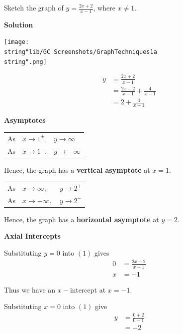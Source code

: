 \documentclass[11pt,a4paper]{book}
\begin{document}
\begin{example}{}

Sketch the graph of ${\displaystyle y=\frac{2x+2}{x-1}}$, where $x\neq1$.

\textbf{Solution}

\begin{center}
\texttt{[image: \\string"lib/GC Screenshots/GraphTechniques1a\\string".png]}
\par\end{center}
\begin{align*}
y & =\frac{2x+2}{x-1}\tag{1}\\
 & =\frac{2x-2}{x-1}+\frac{4}{x-1}\\
 & =2+\frac{4}{x-1}
\end{align*}

\textbf{Asymptotes}

\medskip{}

\begin{tabular}{>{\raggedright}p{0.6cm}>{\raggedright}p{1.8cm}>{\raggedright}p{2cm}}
As & $x\rightarrow1^{+}$, & $y\rightarrow\infty$

\medskip{}\tabularnewline
As & $x\rightarrow1^{-}$, & $y\rightarrow-\infty$

\medskip{}\tabularnewline
\end{tabular}

Hence, the graph has a \textbf{vertical asymptote} at $x=1$.

\begin{tabular}{>{\raggedright}p{0.6cm}>{\raggedright}p{1.8cm}>{\raggedright}p{2cm}}
As & $x\rightarrow\infty,$ & $y\rightarrow2^{+}$

\medskip{}\tabularnewline
As & $x\rightarrow-\infty,$ & $y\rightarrow2^{-}$

\medskip{}\tabularnewline
\end{tabular}

Hence, the graph has a \textbf{horizontal asymptote} at $y=2$.

\textbf{Axial Intercepts}

Substituting $y=0$ into $\left(1\right)$ gives
\begin{align*}
0 & =\frac{2x+2}{x-1}\\
x & =-1
\end{align*}

Thus we have an $x-$intercept at $x=-1$.

Substituting $x=0$ into $\left(1\right)$ give
\begin{align*}
y & =\frac{0+2}{0-1}\\
 & =-2
\end{align*}


\end{example}
\end{document}

